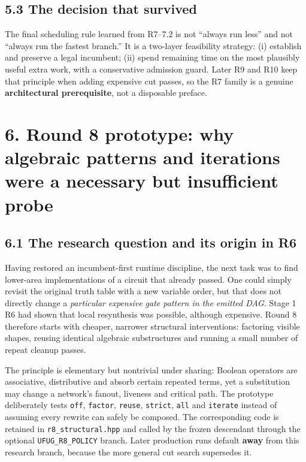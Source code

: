 \documentclass[a4paper,10pt]{article}
\theoremstyle{definition}
\theoremstyle{remark}
\begin{document}
\subsection{5.3 The decision that survived}\label{the-decision-that-survived}

The final scheduling rule learned from R7--7.2 is not ``always run less'' and not ``always run the fastest branch.'' It is a two-layer feasibility strategy: (i) establish and preserve a legal incumbent; (ii) spend remaining time on the most plausibly useful extra work, with a conservative admission guard. Later R9 and R10 keep that principle when adding expensive cut passes, so the R7 family is a genuine \textbf{architectural prerequisite}, not a disposable preface.

\section{6. Round 8 prototype: why algebraic patterns and iterations were a necessary but insufficient probe}\label{round-8-prototype-why-algebraic-patterns-and-iterations-were-a-necessary-but-insufficient-probe}

\subsection{6.1 The research question and its origin in R6}\label{the-research-question-and-its-origin-in-r6}

Having restored an incumbent-first runtime discipline, the next task was to find lower-area implementations of a circuit that already passed. One could simply revisit the original truth table with a new variable order, but that does not directly change a \emph{particular expensive gate pattern in the emitted DAG}. Stage 1 R6 had shown that local resynthesis was possible, although expensive. Round 8 therefore starts with cheaper, narrower structural interventions: factoring visible shapes, reusing identical algebraic substructures and running a small number of repeat cleanup passes.

The principle is elementary but nontrivial under sharing: Boolean operators are associative, distributive and absorb certain repeated terms, yet a substitution may change a network's fanout, liveness and critical path. The prototype deliberately tests \texttt{off}, \texttt{factor}, \texttt{reuse}, \texttt{strict}, \texttt{all} and \texttt{iterate} instead of assuming every rewrite can safely be composed. The corresponding code is retained in \texttt{r8\_structural.hpp} and called by the frozen descendant through the optional \texttt{UFUG\_R8\_POLICY} branch. Later production runs default \textbf{away} from this research branch, because the more general cut search supersedes it.
\end{document}
